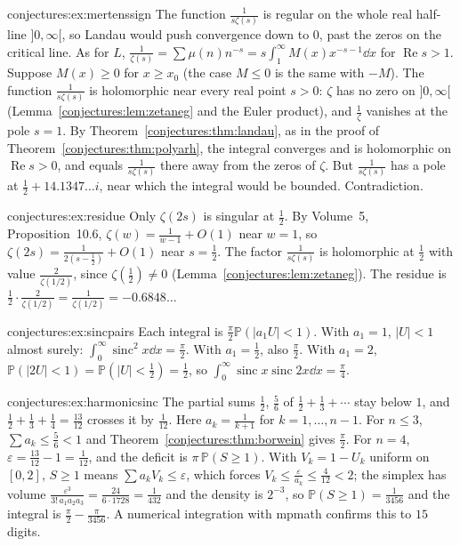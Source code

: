 \begin{solution}{conjectures:ex:mertenssign}
\idea The function $\frac1{s\zeta(s)}$ is regular on the whole real half-line $]0,\infty[$, so Landau would push convergence down to $0$, past the zeros on the
critical line.
\writeup As for $L$, $\frac1{\zeta(s)}=\sum\mu(n)n^{-s}=s\int_1^\infty M(x)x^{-s-1}\dd x$ for $\operatorname{Re}s>1$. Suppose $M(x)\ge0$ for $x\ge x_0$ (the case
$M\le0$ is the same with $-M$). The function $\frac1{s\zeta(s)}$ is holomorphic near every real point $s>0$: $\zeta$ has no zero on $]0,\infty[$ (Lemma~\ref{conjectures:lem:zetaneg}
and the Euler product), and $\frac1\zeta$ vanishes at the pole $s=1$. By Theorem~\ref{conjectures:thm:landau}, as in the proof of Theorem~\ref{conjectures:thm:polyarh}, the integral
converges and is holomorphic on $\operatorname{Re}s>0$, and equals $\frac1{s\zeta(s)}$ there away from the zeros of $\zeta$. But $\frac1{s\zeta(s)}$ has a pole at
$\frac12+14.1347\ldots i$, near which the integral would be bounded. Contradiction.
\end{solution}

\begin{solution}{conjectures:ex:residue}
\idea Only $\zeta(2s)$ is singular at $\frac12$.
\writeup By Volume~5, Proposition~10.6, $\zeta(w)=\frac1{w-1}+O(1)$ near $w=1$, so $\zeta(2s)=\frac1{2(s-\frac12)}+O(1)$ near $s=\frac12$. The factor $\frac1{s\zeta(s)}$
is holomorphic at $\frac12$ with value $\frac2{\zeta(1/2)}$, since $\zeta(\frac12)\ne0$ (Lemma~\ref{conjectures:lem:zetaneg}). The residue is $\frac12\cdot\frac2{\zeta(1/2)}=\frac1{\zeta(1/2)}=-0.6848\ldots$
\end{solution}

\begin{solution}{conjectures:ex:sincpairs}
\idea Each integral is $\frac\pi2\mathbb P(|a_1U|<1)$.
\writeup With $a_1=1$, $|U|<1$ almost surely: $\int_0^\infty\operatorname{sinc}^2x\dd x=\frac\pi2$. With $a_1=\frac12$, also $\frac\pi2$. With $a_1=2$,
$\mathbb P(|2U|<1)=\mathbb P(|U|<\frac12)=\frac12$, so $\int_0^\infty\operatorname{sinc}x\operatorname{sinc}2x\dd x=\frac\pi4$.
\end{solution}

\begin{solution}{conjectures:ex:harmonicsinc}
\idea The partial sums $\frac12$, $\frac56$ of $\frac12+\frac13+\cdots$ stay below $1$, and $\frac12+\frac13+\frac14=\frac{13}{12}$ crosses it by $\frac1{12}$.
\writeup Here $a_k=\frac1{k+1}$ for $k=1,\dots,n-1$. For $n\le3$, $\sum a_k\le\frac56<1$ and Theorem~\ref{conjectures:thm:borwein} gives $\frac\pi2$. For $n=4$,
$\varepsilon=\frac{13}{12}-1=\frac1{12}$, and the deficit is $\pi\,\mathbb P(S\ge1)$. With $V_k=1-U_k$ uniform on $[0,2]$, $S\ge1$ means $\sum a_kV_k\le\varepsilon$,
which forces $V_k\le\frac\varepsilon{a_k}\le\frac4{12}<2$; the simplex has volume $\frac{\varepsilon^3}{3!\,a_1a_2a_3}=\frac{24}{6\cdot1728}=\frac1{432}$ and the density is
$2^{-3}$, so $\mathbb P(S\ge1)=\frac1{3456}$ and the integral is $\frac\pi2-\frac\pi{3456}$. A numerical integration with mpmath confirms this to $15$ digits.
\end{solution}

